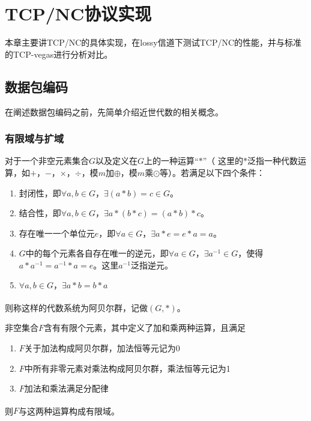 \chapter{TCP/NC协议实现}
本章主要讲TCP/NC的具体实现，在lossy信道下测试TCP/NC的性能，并与标准的TCP-vegas进行分析对比。
\section{数据包编码}
在阐述数据包编码之前，先简单介绍近世代数的相关概念。
\subsection{有限域与扩域}
\begin{myDef}[阿贝尔群]
	对于一个非空元素集合$G$以及定义在$G$上的一种运算“$*$”（ 这里的$*$泛指一种代数运算，如$+$，$-$，$\times$，$\div$，模$m$加$\oplus$，模$m$乘$\odot$等）。若满足以下四个条件：
	\begin{enumerate}[fullwidth,itemindent=2em,label=(\arabic*)]
		\item 封闭性，即$\forall a,b \in G$，$\exists\left(a*b\right)=c\in G$。
		\item 结合性，即$\forall a,b \in G$，$\exists a*\left(b*c\right)=\left(a*b\right)*c$。
		\item 存在唯一一个单位元$e$，即$\forall a \in G$，$\exists a*e=e*a=a$。
		\item $G$中的每个元素各自存在唯一的逆元，即$\forall a \in G$，$\exists {a^{ - 1}} \in G$，使得$a*{a^{-1}}={a^{-1}}*a=e$。这里${a^{-1}}$泛指逆元。
		\item $\forall a,b \in G$，$\exists a*b=b*a$
	\end{enumerate}
	\par
	则称这样的代数系统为阿贝尔群，记做$\left(G,*\right)$\textsuperscript{\cite{zzc2003}}。
\end{myDef}
\begin{myDef}[有限域]
	非空集合$F$含有有限个元素，其中定义了加和乘两种运算，且满足
	\begin{enumerate}[fullwidth,itemindent=2em,label=(\arabic*)]
		\item $F$关于加法构成阿贝尔群，加法恒等元记为0
		\item $F$中所有非零元素对乘法构成阿贝尔群，乘法恒等元记为1
		\item $F$加法和乘法满足分配律
	\end{enumerate}
	\par
	则$F$与这两种运算构成有限域\textsuperscript{\cite{zzc2003}}。
\end{myDef}
